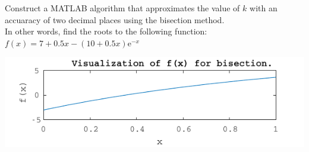 \documentclass{article}
\begin{document}
  Construct a MATLAB algorithm that approximates the value of $k$ with an
  accuaracy of two decimal places using the bisection method. \\

  \noindent
  In other words, find the roots to the following function: \\
  $ f(x) = 7 + 0.5x - (10 + 0.5x)\mathrm{e}^{-x} $\\

  \begin{center}
    \includegraphics{figs/t3_check.pdf}
  \end{center}
\end{document}
